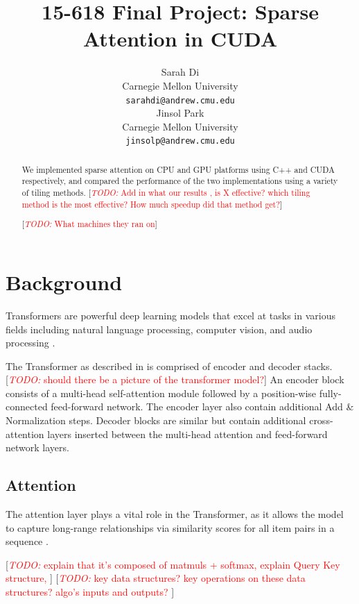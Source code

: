 \documentclass[11pt]{article}
\title{15-618 Final Project: Sparse Attention in CUDA}
\author{Sarah Di \\
  Carnegie Mellon University\\
  \texttt{sarahdi@andrew.cmu.edu} \\\And
  Jinsol Park \\
  Carnegie Mellon University\\
  \texttt{jinsolp@andrew.cmu.edu} \\}
\newcommand{\todo}[1]{[\textcolor{red}{\textit{TODO: }{#1}}]}
\begin{document}
\maketitle
\begin{abstract}
We implemented sparse attention on CPU and GPU platforms using C++ and CUDA respectively, and compared the performance of the two implementations using a variety of tiling methods.
\todo{Add in what our results , is X effective? which tiling method is the most effective? How much speedup did that method get?}


\todo{What machines they ran on}

\end{abstract}

\section{Background}
Transformers are powerful deep learning models that excel at tasks in various fields including natural language processing, computer vision, and audio processing \cite{lin2022survey}. 

The Transformer as described in \citet{vaswani2017attention} is comprised of encoder and decoder stacks. \todo{should there be a picture of the transformer model?} An encoder block consists of a multi-head self-attention module followed by a position-wise fully-connected feed-forward network. The encoder layer also contain additional Add \& Normalization steps. Decoder blocks are similar but contain additional cross-attention layers inserted between the multi-head attention and feed-forward network layers.
\subsection{Attention}
The attention layer plays a vital role in the Transformer, as it allows the model to capture long-range relationships via similarity scores for all item pairs in a sequence \cite{khan2022transformers}. 

\todo{explain that it's composed of matmuls + softmax, explain Query Key structure, }
\todo{key data structures? key operations on these data structures? algo's inputs and outputs? }
\end{document}
